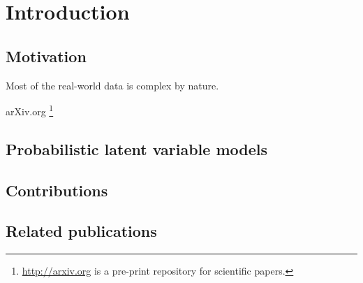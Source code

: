 
\chapter{Introduction}\label{chpt:intro}

\section{Motivation}\label{chpt:intro:sec:motivation}

Most of the real-world data is complex by nature. 

\PP 

\PP arXiv.org \footnote{\url{http://arxiv.org} is a pre-print repository
  for scientific papers.} 

\section{Probabilistic latent variable models}\label{chpt:intro:sec:model}

\section{Contributions}\label{chpt:intro:sec:contribution}

\section{Related publications}

\citet{liang2014codebook}

\citet{liang15content}

\citet{Liang16exposure}

\citet{liang16causal}


